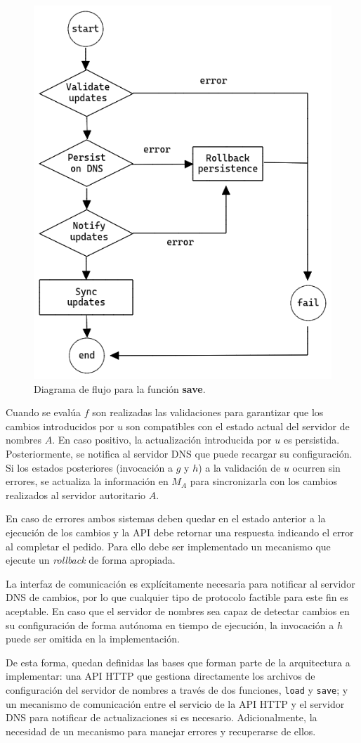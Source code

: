 \begin{figure}[!ht]
    \centering
    \includegraphics[width=0.6\linewidth]{draws/save.png}
    \caption{Diagrama de flujo para la función \textbf{save}.}
\end{figure}

Cuando se evalúa $f$ son realizadas las validaciones para garantizar que los cambios introducidos por $u$ son compatibles con el estado actual del servidor de nombres $A$. En caso positivo, la actualización introducida por $u$ es persistida. Posteriormente, se notifica al servidor DNS que puede recargar su configuración. Si los estados posteriores (invocación a $g$ y $h$) a la validación de $u$ ocurren sin errores, se actualiza la información en $M_A$ para sincronizarla con los cambios realizados al servidor autoritario $A$.

En caso de errores ambos sistemas deben quedar en el estado anterior a la ejecución de los cambios y la API debe retornar una respuesta indicando el error al completar el pedido. Para ello debe ser implementado un mecanismo que ejecute un \textit{rollback} de forma apropiada.

La interfaz de comunicación es explícitamente necesaria para notificar al servidor DNS de cambios, por lo que cualquier tipo de protocolo factible para este fin es aceptable. En caso que el servidor de nombres sea capaz de detectar cambios en su configuración de forma autónoma en tiempo de ejecución, la invocación a $h$ puede ser omitida en la implementación.

De esta forma, quedan definidas las bases que forman parte de la arquitectura a implementar: una API HTTP que gestiona directamente los archivos de configuración del servidor de nombres a través de dos funciones, \verb|load| y \verb|save|; y un mecanismo de comunicación entre el servicio de la API HTTP y el servidor DNS para notificar de actualizaciones si es necesario. Adicionalmente, la necesidad de un mecanismo para manejar errores y recuperarse de ellos.
